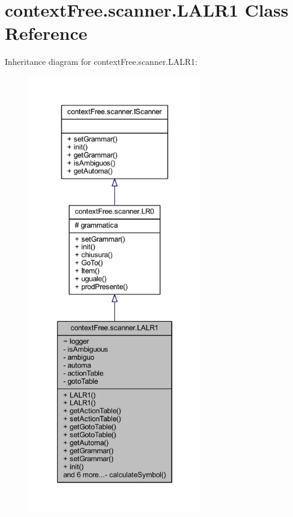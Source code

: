 \hypertarget{classcontext_free_1_1scanner_1_1_l_a_l_r1}{\section{context\-Free.\-scanner.\-L\-A\-L\-R1 Class Reference}
\label{classcontext_free_1_1scanner_1_1_l_a_l_r1}
}


Inheritance diagram for context\-Free.\-scanner.\-L\-A\-L\-R1\-:\nopagebreak
\begin{figure}[H]
\begin{center}
\leavevmode
\includegraphics[height=550pt]{classcontext_free_1_1scanner_1_1_l_a_l_r1__inherit__graph}
\end{center}
\end{figure}


